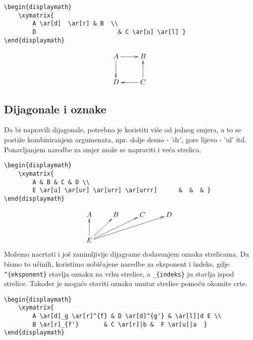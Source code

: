 \begin{verbatim}
\begin{displaymath}
    \xymatrix{
        A \ar[d]  \ar[r] & B  \\
        D                       & C \ar[u] \ar[l] }
\end{displaymath}
\end{verbatim}



\begin{displaymath}
    \xymatrix{
        A \ar[d] \ar[r] & B \\
        D    & C \ar[u] \ar[l] }
\end{displaymath}


\subsection{Dijagonale i oznake}
\justify
Da bi napravili dijagonale, potrebno je koristiti više od jednog smjera, a to se postiže kombiniranjem argumenata, npr. dolje desno - 'dr', gore lijevo - 'ul' itd. Ponavljanjem naredbe za smjer može se napraviti i veća strelica.


\begin{verbatim}
\begin{displaymath}
    \xymatrix{
        A & B & C & D \\
        E \ar[u] \ar[ur] \ar[urr] \ar[urrr]      &  &  & }
\end{displaymath}
\end{verbatim}

\begin{displaymath}
    \xymatrix{
        A & B & C & D \\
        E \ar[u] \ar[ur] \ar[urr] \ar[urrr]      &  &  & }
\end{displaymath}
\newpage
Možemo nacrtati i još zanimljivije dijagrame dodavanjem oznaka strelicama. Da bismo to učinili, koristimo uobičajene naredbe za eksponent i indeks, gdje \verb|^{eksponent}| stavlja oznaku na vrhu strelice, a \verb|_{indeks}| ju stavlja ispod strelice. Također je moguće staviti oznaku unutar strelice pomoću okomite crte.

\begin{verbatim}
\begin{displaymath}
    \xymatrix{
        A \ar[d]_g \ar[r]^{f} & D \ar[d]^{g'} & \ar[l]|d E \\
        B \ar[r]_{f'}       & C \ar[r]|b &  F \ar[u]|a  }
\end{displaymath}
\end{verbatim}

